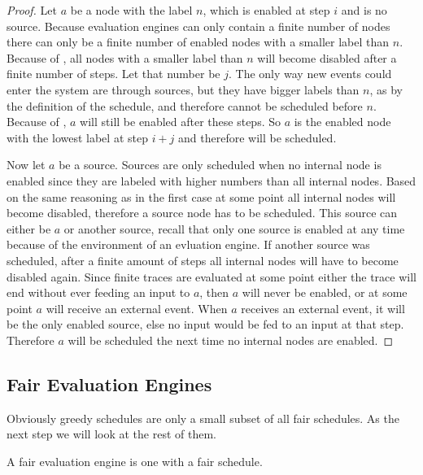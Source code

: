 \begin{proof}
  Let \(a\) be a node with the label \(n\), which is enabled at step \(i\) and is no source.
  Because evaluation engines can only contain a finite number of nodes there can only be a finite number of enabled nodes with a smaller label than \(n\).
  Because of , all nodes with a smaller label than \(n\) will become disabled after a finite number of steps.
  Let that number be \(j\).
  The only way new events could enter the system are through sources, but they have bigger labels than \(n\), as by the definition of the schedule, and therefore cannot be scheduled before \(n\).
  Because of , \(a\) will still be enabled after these steps.
  So \(a\) is the enabled node with the lowest label at step \(i + j\) and therefore will be scheduled.

  Now let \(a\) be a source.
  Sources are only scheduled when no internal node is enabled since they are labeled with higher numbers than all internal nodes.
  Based on the same reasoning as in the first case at some point all internal nodes will become disabled, therefore a source node has to be scheduled.
  This source can either be \(a\) or another source, recall that only one source is enabled at any time because of the environment of an evluation engine.
  If another source was scheduled, after a finite amount of steps all internal nodes will have to become disabled again.
  Since finite traces are evaluated at some point either the trace will end without ever feeding an input to \(a\), then \(a\) will never be enabled, or at some point \(a\) will receive an external event.
  When \(a\) receives an external event, it will be the only enabled source, else no input would be fed to an input at that step.
  Therefore \(a\) will be scheduled the next time no internal nodes are enabled.
\end{proof}


\subsection{Fair Evaluation Engines}
\label{sec:behaviours:behaviour_without_timing:fair}

Obviously greedy schedules are only a small subset of all fair schedules.
As the next step we will look at the rest of them.

\begin{definition}[name = Fair Evaluation Engines]\label{def:fair_evaluation_engines}
  A fair evaluation engine is one with a fair schedule.
\end{definition}

